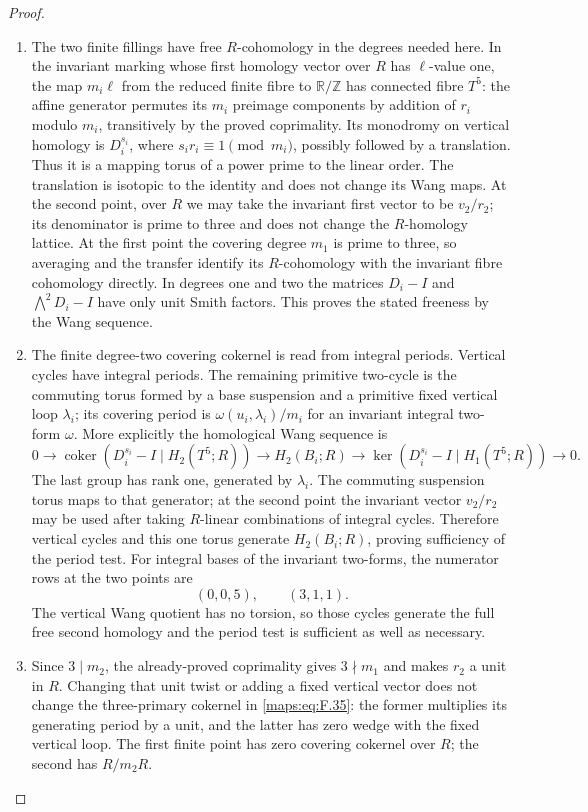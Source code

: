 \documentclass[11pt,a4paper]{article}
\theoremstyle{definition}
\begin{document}
\begin{proof}
\begin{enumerate}[label=\arabic*.]
\item The two finite fillings have free $R$-cohomology in the
degrees needed here.  In the invariant marking whose first
homology vector over $R$ has $\ell$-value one, the map
$m_i\ell$ from the reduced finite fibre to $\mathbb R/\mathbb Z$
has connected fibre $T^5$: the affine generator permutes
its $m_i$ preimage components by addition of $r_i$ modulo
$m_i$, transitively by the proved coprimality.
Its monodromy on vertical homology is $D_i^{s_i}$, where
$s_ir_i\equiv1\pmod {m_i}$, possibly followed by a translation.
Thus it is a mapping torus of a power prime to the linear
order.  The translation is isotopic to the identity and
does not change its Wang maps.  At the second point, over
$R$ we may take the invariant first vector to be $v_2/r_2$;
its denominator is prime to three and does not change the
$R$-homology lattice.  At the first point the covering
degree $m_1$ is prime to three, so averaging and the transfer
identify its $R$-cohomology with the invariant fibre
cohomology directly.
In degrees one and two the matrices
$D_i-I$ and $\bigwedge^2D_i-I$ have only unit Smith factors.
This proves the stated freeness by the Wang sequence.

\item The finite degree-two covering cokernel is read from
integral periods.  Vertical cycles have integral periods.
The remaining primitive two-cycle is the commuting torus
formed by a base suspension and a primitive fixed vertical
loop $\lambda_i$; its covering period is
$\omega(u_i,\lambda_i)/m_i$ for an invariant integral
two-form $\omega$.
More explicitly the homological Wang sequence is
\[
 0\longrightarrow\operatorname{coker}(D_i^{s_i}-I\mid H_2(T^5;R))
 \longrightarrow H_2(B_i;R)
 \longrightarrow\ker(D_i^{s_i}-I\mid H_1(T^5;R))
 \longrightarrow0.
\]
The last group has rank one, generated by $\lambda_i$.
The commuting suspension torus maps to that generator;
at the second point the invariant vector $v_2/r_2$ may be used after taking
$R$-linear combinations of integral cycles.
Therefore vertical cycles and this one torus generate
$H_2(B_i;R)$, proving sufficiency of the period test.
For integral bases of the invariant two-forms, the numerator
rows at the two points are
\[
 (0,0,5),\qquad (3,1,1).
 \tag{F.35}\label{maps:eq:F.35}
\]
The vertical Wang quotient has no torsion, so those cycles
generate the full free second homology and the period test
is sufficient as well as necessary.

\item Since $3\mid m_2$, the already-proved coprimality gives
$3\nmid m_1$ and makes $r_2$ a unit in $R$.
Changing that unit twist or adding a fixed vertical vector
does not change the three-primary cokernel in \eqref{maps:eq:F.35}: the
former multiplies its generating period by a unit, and the
latter has zero wedge with the fixed vertical loop.
The first finite point has zero covering cokernel over $R$;
the second has $R/m_2R$.


\end{enumerate}
\end{proof}
\end{document}
